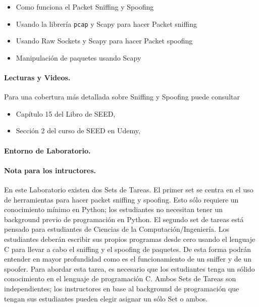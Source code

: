 \begin{itemize}[noitemsep]
\item Como funciona el Packet Sniffing y Spoofing
\item Usando la librería {\tt pcap} y Scapy para hacer Packet sniffing
\item Usando Raw Sockets y Scapy para hacer Packet spoofing 
\item Manipulación de paquetes usando Scapy
\end{itemize}



\paragraph{Lecturas y Videos.}
Para una cobertura más detallada sobre Sniffing y Spoofing puede consultar


\begin{itemize}
\item Capítulo 15 del Libro de SEED, \seedbook
\item Sección 2 del curso de SEED en Udemy, \seedisvideo
\end{itemize}



\paragraph{Entorno de Laboratorio.} \seedenvironmentC



\paragraph{Nota para los intructores.}
En este Laboratorio existen dos Sets de Tareas. El primer set se centra en el uso de herramientas para hacer packet sniffing y spoofing. Esto sólo requiere un conocimiento mínimo en Python; los estudiantes no necesitan tener un background previo de programación en Python.
El segundo set de tareas está pensado para estudiantes de Ciencias de la Computación/Ingeniería. 
Los estudiantes deberán escribir sus propios programas desde cero usando el lenguaje C para llevar a cabo el sniffing y el spoofing de paquetes. De esta forma podrán entender en mayor profundidad como es el funcionamiento de un sniffer y de un spoofer. Para abordar esta tarea, es necesario que los estudiantes tenga un sólido conocimiento en el lenguaje de programación C.
Ambos Sets de Tareas son independientes; los instructores en base al background de programación que tengan sus estudiantes pueden elegir asignar un sólo Set o ambos.



